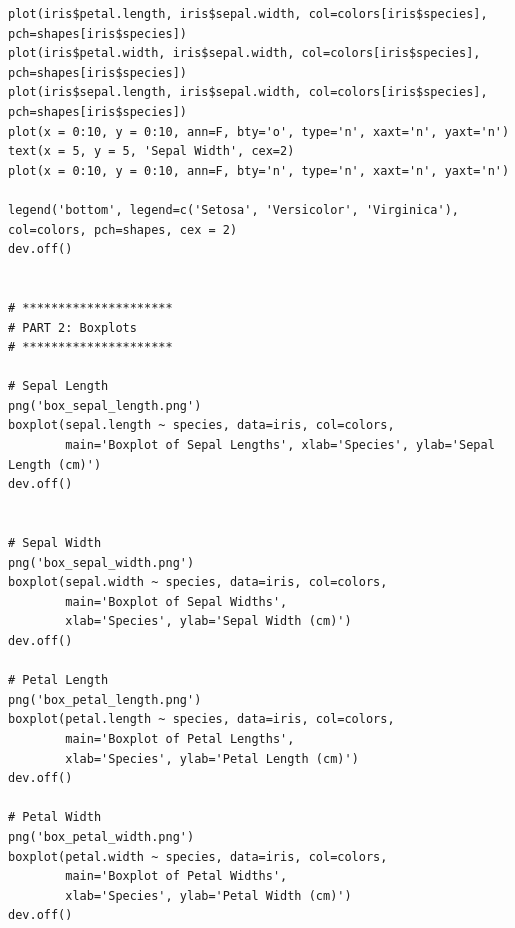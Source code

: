\documentclass{article}
\begin{document}
\begin{lstlisting}[style=R]
plot(iris$petal.length, iris$sepal.width, col=colors[iris$species], pch=shapes[iris$species])
plot(iris$petal.width, iris$sepal.width, col=colors[iris$species], pch=shapes[iris$species])
plot(iris$sepal.length, iris$sepal.width, col=colors[iris$species], pch=shapes[iris$species])
plot(x = 0:10, y = 0:10, ann=F, bty='o', type='n', xaxt='n', yaxt='n')
text(x = 5, y = 5, 'Sepal Width', cex=2)
plot(x = 0:10, y = 0:10, ann=F, bty='n', type='n', xaxt='n', yaxt='n')

legend('bottom', legend=c('Setosa', 'Versicolor', 'Virginica'), col=colors, pch=shapes, cex = 2)
dev.off()


# *********************
# PART 2: Boxplots
# *********************

# Sepal Length
png('box_sepal_length.png')
boxplot(sepal.length ~ species, data=iris, col=colors,
        main='Boxplot of Sepal Lengths', xlab='Species', ylab='Sepal Length (cm)')
dev.off()


# Sepal Width
png('box_sepal_width.png')
boxplot(sepal.width ~ species, data=iris, col=colors,
        main='Boxplot of Sepal Widths',
        xlab='Species', ylab='Sepal Width (cm)')
dev.off()

# Petal Length
png('box_petal_length.png')
boxplot(petal.length ~ species, data=iris, col=colors,
        main='Boxplot of Petal Lengths',
        xlab='Species', ylab='Petal Length (cm)')
dev.off()

# Petal Width
png('box_petal_width.png')
boxplot(petal.width ~ species, data=iris, col=colors,
        main='Boxplot of Petal Widths',
        xlab='Species', ylab='Petal Width (cm)')
dev.off()
\end{lstlisting}
\end{document}
